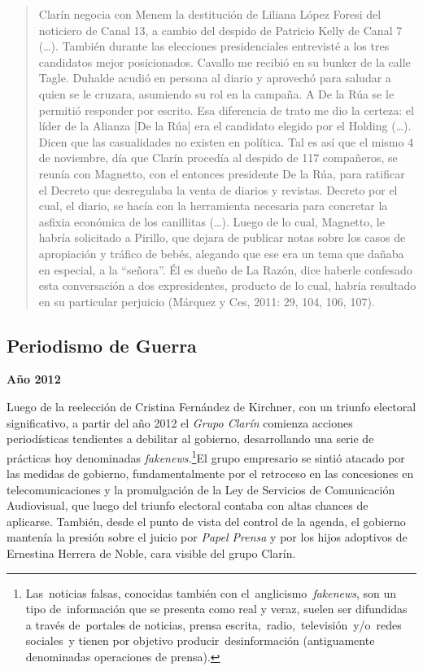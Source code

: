\begin{quote}
Clarín negocia con Menem la destitución de Liliana López Foresi del noticiero de Canal 13, a cambio del despido de Patricio Kelly de Canal 7 (\ldots). También durante las elecciones presidenciales entrevisté a los tres candidatos mejor posicionados. Cavallo me recibió en su bunker de la calle Tagle. Duhalde acudió en persona al diario y aprovechó para saludar a quien se le cruzara, asumiendo su rol en la campaña. A De la Rúa se le permitió responder por escrito. Esa diferencia de trato me dio la certeza: el líder de la Alianza {[}De la Rúa{]} era el candidato elegido por el Holding (\ldots). Dicen que las casualidades no existen en política. Tal es así que el mismo 4 de noviembre, día que Clarín procedía al despido de 117 compañeros, se reunía con Magnetto, con el entonces presidente De la Rúa, para ratificar el Decreto que desregulaba la venta de diarios y revistas. Decreto por el cual, el diario, se hacía con la herramienta necesaria para concretar la asfixia económica de los canillitas (\ldots). Luego de lo cual, Magnetto, le habría solicitado a Pirillo, que dejara de publicar notas sobre los casos de apropiación y tráfico de bebés, alegando que ese era un tema que dañaba en especial, a la ``señora''. Él es dueño de La Razón, dice haberle confesado esta conversación a dos expresidentes, producto de lo cual, habría resultado en su particular perjuicio (Márquez y Ces, 2011: 29, 104, 106, 107).
\end{quote}

\subsection{Periodismo de Guerra}

\textbf{Año 2012}

Luego de la reelección de Cristina Fernández de Kirchner, con un triunfo electoral significativo, a partir del año 2012 el \emph{Grupo Clarín} comienza acciones periodísticas tendientes a debilitar al gobierno, desarrollando una serie de prácticas hoy denominadas \emph{fakenews.}\footnote{Las~noticias falsas, conocidas también con el~anglicismo~\emph{fakenews}, son un tipo de~información que se presenta como real y veraz, suelen ser difundidas a través de~portales de noticias, prensa escrita,~radio,~televisión~y/o~redes sociales~y tienen por objetivo producir~desinformación (antiguamente denominadas operaciones de prensa).}El grupo empresario se sintió atacado por las medidas de gobierno, fundamentalmente por el retroceso en las concesiones en telecomunicaciones y la promulgación de la Ley de Servicios de Comunicación Audiovisual, que luego del triunfo electoral contaba con altas chances de aplicarse. También, desde el punto de vista del control de la agenda, el gobierno mantenía la presión sobre el juicio por \emph{Papel Prensa} y por los hijos adoptivos de Ernestina Herrera de Noble, cara visible del grupo Clarín.

